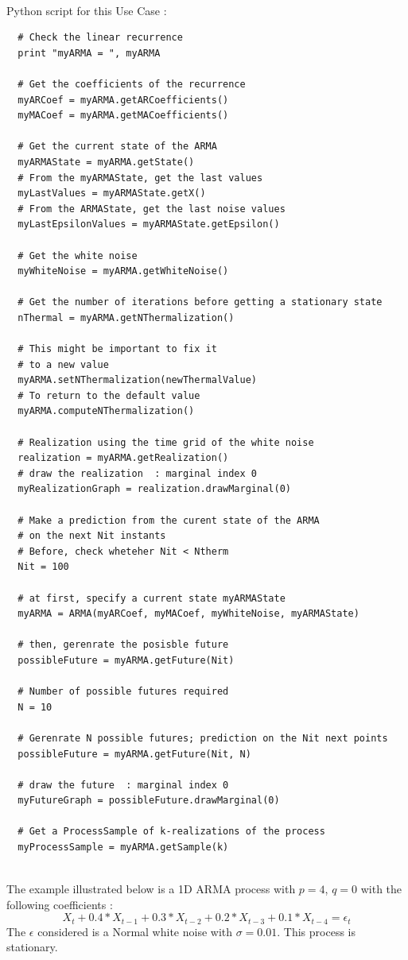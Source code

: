 \textspace\\
Python script for this Use Case :

\begin{lstlisting}
  # Check the linear recurrence 
  print "myARMA = ", myARMA

  # Get the coefficients of the recurrence
  myARCoef = myARMA.getARCoefficients()
  myMACoef = myARMA.getMACoefficients()

  # Get the current state of the ARMA
  myARMAState = myARMA.getState()  
  # From the myARMAState, get the last values
  myLastValues = myARMAState.getX()
  # From the ARMAState, get the last noise values
  myLastEpsilonValues = myARMAState.getEpsilon()

  # Get the white noise
  myWhiteNoise = myARMA.getWhiteNoise()

  # Get the number of iterations before getting a stationary state
  nThermal = myARMA.getNThermalization()

  # This might be important to fix it
  # to a new value 
  myARMA.setNThermalization(newThermalValue)
  # To return to the default value
  myARMA.computeNThermalization()

  # Realization using the time grid of the white noise
  realization = myARMA.getRealization()
  # draw the realization  : marginal index 0
  myRealizationGraph = realization.drawMarginal(0)

  # Make a prediction from the curent state of the ARMA
  # on the next Nit instants
  # Before, check wheteher Nit < Ntherm
  Nit = 100

  # at first, specify a current state myARMAState
  myARMA = ARMA(myARCoef, myMACoef, myWhiteNoise, myARMAState)

  # then, gerenrate the posisble future
  possibleFuture = myARMA.getFuture(Nit)

  # Number of possible futures required
  N = 10

  # Gerenrate N possible futures; prediction on the Nit next points
  possibleFuture = myARMA.getFuture(Nit, N)

  # draw the future  : marginal index 0
  myFutureGraph = possibleFuture.drawMarginal(0)

  # Get a ProcessSample of k-realizations of the process
  myProcessSample = myARMA.getSample(k)  
\end{lstlisting}

\textspace\\
The example illustrated  below is a 1D ARMA process with $p = 4$, $q=0$ with the following coefficients :
$$ X_t + 0.4 * X_{t-1} + 0.3 * X_{t-2} + 0.2 * X_{t-3} + 0.1 * X_{t-4} = \epsilon_{t}$$
The $\epsilon$ considered is a Normal white noise with $\sigma = 0.01$. This process is stationary.\\

